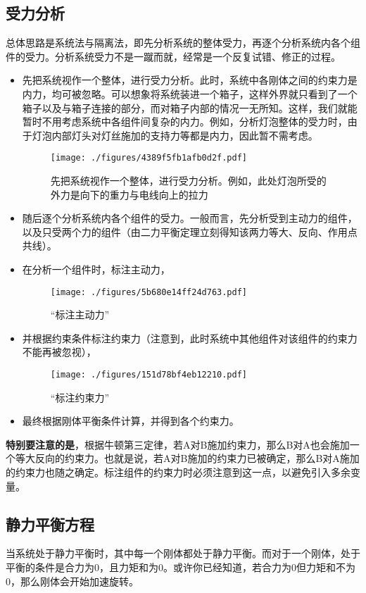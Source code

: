\subsection{受力分析}
总体思路是系统法与隔离法，即先分析系统的整体受力，再逐个分析系统内各个组件的受力。分析系统受力不是一蹴而就，经常是一个反复试错、修正的过程。
\begin{itemize}
\item 先把系统视作一个整体，进行受力分析。此时，系统中各刚体之间的约束力是内力，均可被忽略。可以想象将系统装进一个箱子，这样外界就只看到了一个箱子以及与箱子连接的部分，而对箱子内部的情况一无所知。这样，我们就能暂时不用考虑系统中各组件间复杂的内力。例如，分析灯泡整体的受力时，由于灯泡内部灯头对灯丝施加的支持力等都是内力，因此暂不需考虑。
\begin{figure}[ht]
\centering
\texttt{[image: ./figures/4389f5fb1afb0d2f.pdf]}
\caption{先把系统视作一个整体，进行受力分析。例如，此处灯泡所受的外力是向下的重力与电线向上的拉力} \label{fig_RGDFA_16}
\end{figure}

\item 随后逐个分析系统内各个组件的受力。一般而言，先分析受到主动力的组件，以及只受两个力的组件（由二力平衡定理立刻得知该两力等大、反向、作用点共线）。
\item 在分析一个组件时，标注主动力，
\begin{figure}[ht]
\centering
\texttt{[image: ./figures/5b680e14ff24d763.pdf]}
\caption{“标注主动力”} \label{fig_RGDFA_12}
\end{figure}
\item 并根据约束条件标注约束力（注意到，此时系统中其他组件对该组件的约束力不能再被忽视），
\begin{figure}[ht]
\centering
\texttt{[image: ./figures/151d78bf4eb12210.pdf]}
\caption{“标注约束力”} \label{fig_RGDFA_13}
\end{figure}
\item 最终根据刚体平衡条件计算，并得到各个约束力。
\end{itemize}

\textbf{特别要注意的是}，根据牛顿第三定律，若A对B施加约束力，那么B对A也会施加一个等大反向的约束力。也就是说，若A对B施加的约束力已被确定，那么B对A施加的约束力也随之确定。标注组件的约束力时必须注意到这一点，以避免引入多余变量。

\subsection{静力平衡方程}\label{sub_RGDFA_1}
当系统处于静力平衡时，其中每一个刚体都处于静力平衡。而对于一个刚体，处于平衡的条件是合力为0，且力矩和为0。或许你已经知道，若合力为0但力矩和不为0，那么刚体会开始加速旋转。


